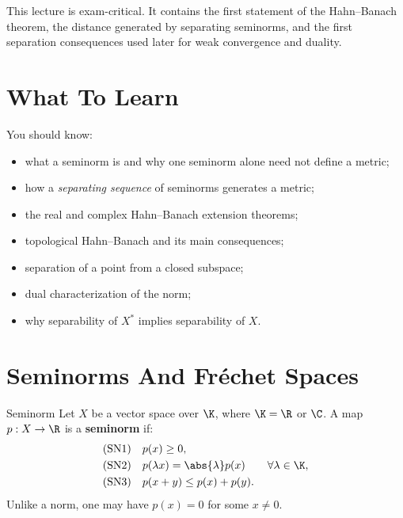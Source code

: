 \documentclass[11pt]{article}
\begin{document}

\vspace{0.8em}

\begin{focusbox}
This lecture is exam-critical. It contains the first statement of the Hahn--Banach theorem, the distance generated by separating seminorms, and the first separation consequences used later for weak convergence and duality.
\end{focusbox}

\tableofcontents

\section{What To Learn}

\begin{focusbox}
You should know:
\begin{itemize}
\item what a seminorm is and why one seminorm alone need not define a metric;
\item how a \emph{separating sequence} of seminorms generates a metric;
\item the real and complex Hahn--Banach extension theorems;
\item topological Hahn--Banach and its main consequences;
\item separation of a point from a closed subspace;
\item dual characterization of the norm;
\item why separability of $X^*$ implies separability of $X$.
\end{itemize}
\end{focusbox}

\section{Seminorms And Fr\'echet Spaces}

\begin{defbox}{Seminorm}
Let $X$ be a vector space over $\K$, where $\K=\R$ or $\C$. A map $p:X\to\R$ is a \textbf{seminorm} if:
\begin{align*}
\text{(SN1)}\quad & p(x)\ge 0,
\\
\text{(SN2)}\quad & p(\lambda x)=\abs{\lambda}p(x) \qquad \forall \lambda\in\K,
\\
\text{(SN3)}\quad & p(x+y)\le p(x)+p(y).
\end{align*}
Unlike a norm, one may have $p(x)=0$ for some $x\neq 0$.
\end{defbox}
\end{document}
